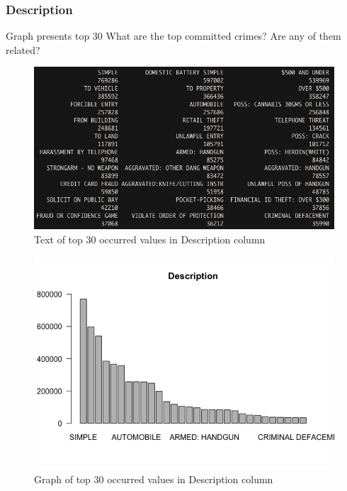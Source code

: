 \newpage
\subsubsection{Description}
Graph presents top 30
What are the top committed crimes? Are any of them related?
\begin{figure}[H]
\includegraphics[scale=0.5]{images/EDA/Description.jpg}
\centering
\caption{Text of top 30 occurred values in Description column}
\end{figure}
\begin{figure}[H]
\includegraphics[scale=0.7]{images/EDA/Description.png}
\centering
\caption{Graph of top 30 occurred values in Description column}
\end{figure}